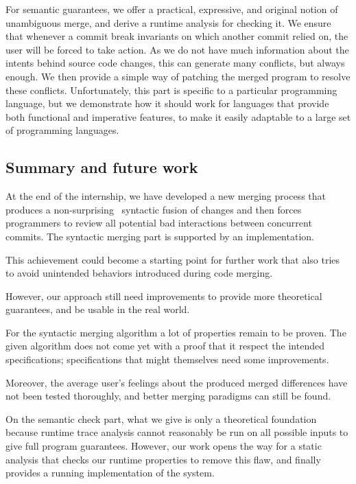 \documentclass[a4paper,11pt]{article}
\newcommand\yrg[1]{}%
\newcommand\todo[1]{}%
\begin{document}
For semantic guarantees, we offer a practical, expressive, and
original notion of unambiguous merge, and derive a runtime analysis
for checking it. We ensure that whenever a commit break invariants on
which another commit relied on, the user will be forced to take
action. As we do not have much information about the intents behind
source code changes, this can generate many conflicts, but always
enough. We then provide a simple way of patching the merged program to
resolve these conflicts.  Unfortunately, this part is specific to a
particular programming language, but we demonstrate how it should work
for languages that provide both functional and imperative features,
to make it easily adaptable to a large set of programming languages.

\subsection*{Summary and future work}


At the end of the internship, we have developed a new merging process
that produces a non-surprising~\yrg{predictable?} syntactic fusion of
changes and then forces programmers to review all potential bad
interactions between concurrent commits. The syntactic merging part is
supported by an implementation.

This achievement could become a starting point for further work that
also tries to avoid unintended behaviors introduced during code
merging.

However, our approach still need improvements to provide more
theoretical guarantees, and be usable in the real world.

For the syntactic merging algorithm a lot of properties remain to be
proven. The given algorithm does not come yet with a proof that it
respect the intended specifications; specifications that might
themselves need some improvements.

Moreover, the average user's feelings about the produced merged
differences have not been tested thoroughly, and better merging
paradigms can still be found.

On the semantic check part, what we give is only a theoretical
foundation because runtime trace analysis cannot reasonably be run on
all possible inputs to give full program guarantees. However, our work
opens the way for a static analysis that checks our runtime properties
to remove this flaw, and finally provides a running implementation of
the system.
\end{document}
